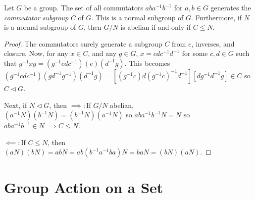 \begin{theorem}
    Let $G$ be a group. The set of all commutators $aba^{-1}b^{-1}$ for $a,b \in G$ generates the \emph{commutator subgroup} $C$ of $G$. This is a normal subgroup of $G$. Furthermore, if $N$ is a normal subgroup of $G$, then $G/N$ is abelian if and only if $C \leq N$.
\end{theorem}
\begin{proof}
    The commutators surely generate a subgroup $C$ from $e$, inverses, and closure. Now, for any $x \in C$, and any $g \in G$, $x = cdc^{-1}d^{-1}$ for some $c,d \in G$ such that $g^{-1}xg = (g^{-1}cdc^{-1})(e)(d^{-1}g)$. This becomes $(g^{-1}cdc^{-1})(gd^{-1}g^{-1})(d^{-1}g) = [(g^{-1}c)d(g^{-1}c)^{-1}d^{-1}][dg^{-1}d^{-1}g] \in C$ so $C \vartriangleleft G$. 
    
    Next, if $N \vartriangleleft G$, then $\implies\colon$If $G/N$ abelian, $(a^{-1}N)(b^{-1}N)=(b^{-1}N)(a^{-1}N)$ so $aba^{-1}b^{-1}N=N$ so $aba^{-1}b^{-1}\in N \implies C \leq N$. 
    
    $\impliedby\colon$If $C\leq N$, then $(aN)(bN) = abN = ab(b^{-1}a^{-1}ba)N = baN = (bN)(aN)$.
\end{proof}

\section{Group Action on a Set}

